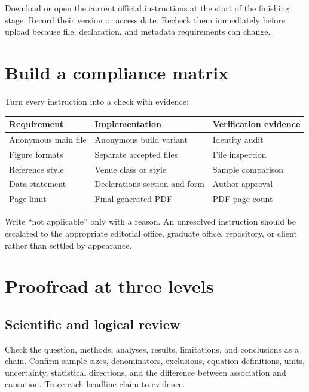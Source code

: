 \begin{submissioncheck}
Download or open the current official instructions at the start of the finishing
stage. Record their version or access date. Recheck them immediately before
upload because file, declaration, and metadata requirements can change.
\end{submissioncheck}

\section{Build a compliance matrix}

Turn every instruction into a check with evidence:

\begin{center}
\begin{tabularx}{\textwidth}{@{}p{}Xp{}@{}}
  \toprule
  Requirement & Implementation & Verification evidence \\
  \midrule
  Anonymous main file & Anonymous build variant & Identity audit \\
  Figure formats & Separate accepted files & File inspection \\
  Reference style & Venue class or style & Sample comparison \\
  Data statement & Declarations section and form & Author approval \\
  Page limit & Final generated PDF & PDF page count \\
  \bottomrule
\end{tabularx}
\end{center}

Write ``not applicable'' only with a reason. An unresolved instruction should
be escalated to the appropriate editorial office, graduate office, repository,
or client rather than settled by appearance.

\section{Proofread at three levels}

\subsection{Scientific and logical review}

Check the question, methods, analyses, results, limitations, and conclusions as
a chain. Confirm sample sizes, denominators, exclusions, equation definitions,
units, uncertainty, statistical directions, and the difference between
association and causation. Trace each headline claim to evidence.

